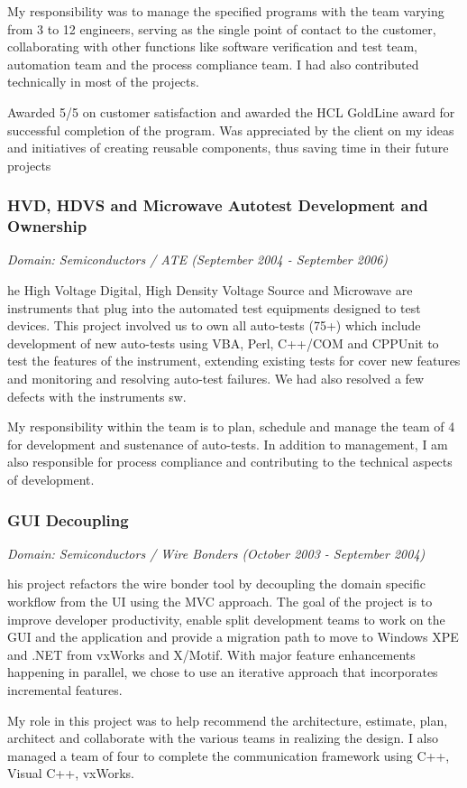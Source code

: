 \documentclass[a4paper,11pt]{article}
\newcommand\cvprojectentry[5]{
  \subsubsection*{#1}
  
  \vspace{-7pt}
  
  \it{Domain: #2}\normalfont{} \quad (#3 - #4)
  
}
\begin{document}
\begin{multicols}{2}
My responsibility was to manage the specified programs with the team
varying from 3 to 12 engineers, serving as the single point of contact
to the customer, collaborating with other functions like software
verification and test team, automation team and the process compliance
team. I had also contributed technically in most of the projects.
 
Awarded 5/5 on customer satisfaction and awarded the HCL GoldLine
award for successful completion of the program. Was appreciated by the
client on my ideas and initiatives of creating reusable components,
thus saving time in their future projects
 
\cvprojectentry{HVD, HDVS and Microwave Autotest Development and
  Ownership}{Semiconductors / ATE}{September 2004}{September 2006}

The High Voltage Digital, High Density Voltage Source and Microwave
are instruments that plug into the automated test equipments designed
to test devices. This project involved us to own all auto-tests (75+)
which include development of new auto-tests using VBA, Perl, C++/COM
and CPPUnit to test the features of the instrument, extending existing
tests for cover new features and monitoring and resolving auto-test
failures. We had also resolved a few defects with the instruments sw.
 
My responsibility within the team is to plan, schedule and manage the
team of 4 for development and sustenance of auto-tests. In addition
to management, I am also responsible for process compliance and
contributing to the technical aspects of development.
 
\cvprojectentry{GUI Decoupling}{Semiconductors / Wire Bonders}{October 2003}{September 2004}

This project refactors the wire bonder tool by decoupling the domain
specific workflow from the UI using the MVC approach. The goal of the
project is to improve developer productivity, enable split development
teams to work on the GUI and the application and provide a migration
path to move to Windows XPE and .NET from vxWorks and X/Motif. With
major feature enhancements happening in parallel, we chose to use an
iterative approach that incorporates incremental features.
 
My role in this project was to help recommend the architecture,
estimate, plan, architect and collaborate with the various teams in
realizing the design. I also managed a team of four to complete the
communication framework using C++, Visual C++, vxWorks.
 

\end{multicols}
\end{document}
